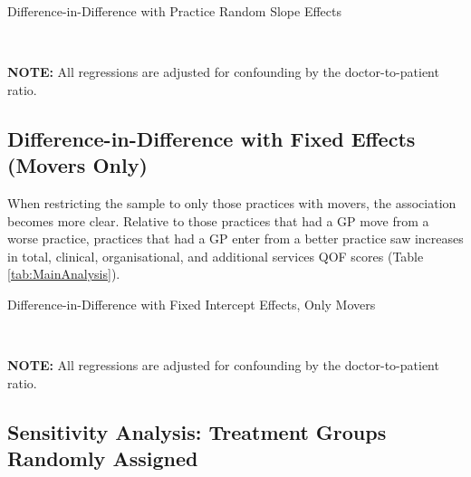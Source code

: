 \documentclass[11pt]{article}
\begin{document}
\begin{landscape}
  \begin{table}[htp]
  \caption{Difference-in-Difference with Practice Random Slope Effects}
    \begin{threeparttable}
      \\
    \begin{tablenotes}
    \footnotesize
    \textbf{NOTE:} All regressions are adjusted for confounding by the doctor-to-patient ratio.
    \end{tablenotes}
    \end{threeparttable}
    \label{tab:DDRE}
  \end{table}
\end{landscape}




\subsection{Difference-in-Difference with Fixed Effects (Movers Only)}

When restricting the sample to only those practices with movers, the association becomes more clear. Relative to those practices that had a GP move from a worse practice, practices that had a GP enter from a better practice saw increases in total, clinical, organisational, and additional services QOF scores (Table \ref{tab:MainAnalysis}).


\begin{landscape}
  \begin{table}[htp]
  \caption{Difference-in-Difference with Fixed Intercept Effects, Only Movers}
    \begin{threeparttable}
      \\
    \begin{tablenotes}
    \footnotesize
    \textbf{NOTE:} All regressions are adjusted for confounding by the doctor-to-patient ratio.
    \end{tablenotes}
    \end{threeparttable}
    \label{tab:MainAnalysis}
  \end{table}
\end{landscape}


\subsection{Sensitivity Analysis: Treatment Groups Randomly Assigned}
\end{document}
